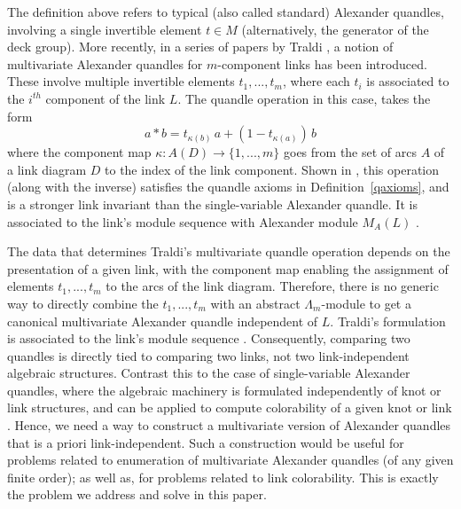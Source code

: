 \documentclass[a4paper,12pt]{article}
\newcommand{\Lam}{\Lambda}
\begin{document}
The definition above refers to typical (also called standard) Alexander quandles, involving a single invertible element $t \in M$ (alternatively, the generator of the deck group).  More recently, in a series of papers  by Traldi  \cite{traldi0, traldi1, traldi2, traldi3, traldi4, traldi5, traldi6},  a notion of multivariate Alexander quandles for $m$-component links has been introduced. These involve multiple invertible elements $t_1, ... , t_m$, where each $t_i$ is associated to the $i^{th}$ component of the link $L$. The quandle operation in this case, takes the form 
\[  a * b = t_{\kappa (b)} \, a + (1  -  t_{\kappa (a)}) \, b    \]
where the component map $\kappa : A(D) \to \{ 1, ... , m  \}$ goes from the set of arcs $A$ of a link diagram $D$ to the index of the link component. Shown in \cite{traldi1}, this operation (along with the inverse) satisfies the quandle axioms in Definition~\ref{qaxioms}, and is a stronger link invariant than the single-variable Alexander quandle. It is associated to the link's module sequence  \cite{crowell1969elementary, hillman1981alexander}  with Alexander module $M_A (L)$  \cite{traldi1}.   

The data that determines Traldi's multivariate quandle operation  depends on the presentation of a given link, with the component map enabling the assignment of elements $t_1, ... , t_m$ to the arcs of the link diagram. Therefore, there is no generic way to directly combine the $t_1, ... , t_m$  with an abstract $\Lam_m$-module to get a canonical multivariate Alexander quandle independent of $L$. Traldi's formulation is associated to the link's module sequence \cite{crowell1969elementary, hillman1981alexander}. Consequently, comparing two quandles is directly tied to comparing two links, not two link-independent algebraic structures. Contrast this to the case of single-variable Alexander quandles, where the algebraic machinery is formulated independently of knot or link structures, and can be applied to compute colorability of a given knot or link \cite{kauffman2018colorings}.  Hence, we need a way to construct a multivariate version of Alexander quandles that is a priori link-independent. Such a construction would be useful for problems related to enumeration of  multivariate Alexander quandles (of any given finite order); as well as, for problems related to link colorability.  This is exactly the problem we address and solve in this paper. 
 
\end{document}
